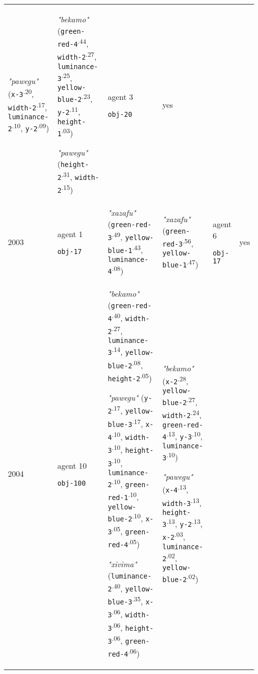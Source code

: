 {\begin{tabular}{p{0.4cm}p{1.4cm}p{7cm}p{7cm}p{1.4cm}p{0.6cm}}
\textit{"pawegu"} (\texttt{x-3}\textsuperscript{.20}, \texttt{width-2}\textsuperscript{.17}, \texttt{luminance-2}\textsuperscript{.10}, \texttt{y-2}\textsuperscript{.09}) & \textit{"bekamo"} (\texttt{green-red-4}\textsuperscript{.44}, \texttt{width-2}\textsuperscript{.27}, \texttt{luminance-3}\textsuperscript{.25}, \texttt{yellow-blue-2}\textsuperscript{.23}, \texttt{y-2}\textsuperscript{.11}, \texttt{height-1}\textsuperscript{.03})

\textit{"pawegu"} (\texttt{height-2}\textsuperscript{.31}, \texttt{width-2}\textsuperscript{.15}) & agent 3 

 \texttt{obj-20} & yes \\
2003 & agent 1 

\texttt{obj-17} &\textit{"xazafu"} (\texttt{green-red-3}\textsuperscript{.49}, \texttt{yellow-blue-1}\textsuperscript{.43}, \texttt{luminance-4}\textsuperscript{.08}) & \textit{"xazafu"} (\texttt{green-red-3}\textsuperscript{.56}, \texttt{yellow-blue-1}\textsuperscript{.47}) & agent 6 

 \texttt{obj-17} & yes \\
2004 & agent 10 

\texttt{obj-100} &\textit{"bekamo"} (\texttt{green-red-4}\textsuperscript{.40}, \texttt{width-2}\textsuperscript{.27}, \texttt{luminance-3}\textsuperscript{.14}, \texttt{yellow-blue-2}\textsuperscript{.08}, \texttt{height-2}\textsuperscript{.05})

\textit{"pawegu"} (\texttt{y-2}\textsuperscript{.17}, \texttt{yellow-blue-3}\textsuperscript{.17}, \texttt{x-4}\textsuperscript{.10}, \texttt{width-3}\textsuperscript{.10}, \texttt{height-3}\textsuperscript{.10}, \texttt{luminance-2}\textsuperscript{.10}, \texttt{green-red-1}\textsuperscript{.10}, \texttt{yellow-blue-2}\textsuperscript{.10}, \texttt{x-3}\textsuperscript{.05}, \texttt{green-red-4}\textsuperscript{.05})

\textit{"xivima"} (\texttt{luminance-2}\textsuperscript{.40}, \texttt{yellow-blue-3}\textsuperscript{.35}, \texttt{x-3}\textsuperscript{.06}, \texttt{width-3}\textsuperscript{.06}, \texttt{height-3}\textsuperscript{.06}, \texttt{green-red-4}\textsuperscript{.06}) & \textit{"bekamo"} (\texttt{x-2}\textsuperscript{.28}, \texttt{yellow-blue-2}\textsuperscript{.27}, \texttt{width-2}\textsuperscript{.24}, \texttt{green-red-4}\textsuperscript{.13}, \texttt{y-3}\textsuperscript{.10}, \texttt{luminance-3}\textsuperscript{.10})

\textit{"pawegu"} (\texttt{x-4}\textsuperscript{.13}, \texttt{width-3}\textsuperscript{.13}, \texttt{height-3}\textsuperscript{.13}, \texttt{y-2}\textsuperscript{.13}, \texttt{x-2}\textsuperscript{.03}, \texttt{luminance-2}\textsuperscript{.02}, \texttt{yellow-blue-2}\textsuperscript{.02})


\end{tabular}}
